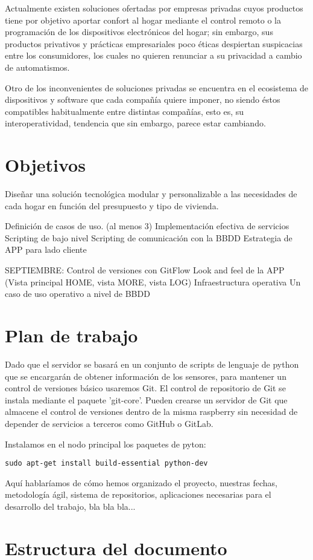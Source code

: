 Actualmente existen soluciones ofertadas por empresas privadas cuyos productos tiene por objetivo aportar confort al hogar mediante el control remoto o la programación de los dispositivos electrónicos del hogar; sin embargo, sus productos privativos y prácticas empresariales poco éticas despiertan suspicacias entre los consumidores, los cuales no quieren renunciar a su privacidad a cambio de automatismos.

Otro de los inconvenientes de soluciones privadas se encuentra en el ecosistema de dispositivos y software que cada compañía quiere imponer, no siendo éstos compatibles habitualmente entre distintas compañías, esto es, su interoperatividad, tendencia que sin embargo, parece estar cambiando.

\section{Objetivos}
\label{ch:Capitulo1.3}

Diseñar una solución tecnológica modular y personalizable a las necesidades de cada hogar en función del presupuesto y tipo de vivienda.

Definición de casos de uso. (al menos 3)
Implementación efectiva de servicios
Scripting de bajo nivel
Scripting de comunicación con la BBDD
Estrategia de APP para lado cliente

SEPTIEMBRE:
Control de versiones con GitFlow
Look and feel de la APP (Vista principal HOME, vista MORE, vista LOG)
Infraestructura operativa
Un caso de uso operativo a nivel de BBDD

\section{Plan de trabajo}
\label{ch:Capitulo1.4}

Dado que el servidor se basará en un conjunto de scripts de lenguaje de python que se encargarán de obtener información de los sensores, para mantener un control de versiones básico usaremos Git. El control de repositorio de Git se instala mediante el paquete 'git-core'. Pueden crearse un servidor de Git que almacene el control de versiones dentro de la misma raspberry sin necesidad de depender de servicios a terceros como GitHub o GitLab.

Instalamos en el nodo principal los paquetes de pyton:
\begin{verbatim}
sudo apt-get install build-essential python-dev
\end{verbatim}

Aquí hablaríamos de cómo hemos organizado el proyecto, nuestras fechas, metodología ágil, sistema de repositorios, aplicaciones necesarias para el desarrollo del trabajo, bla bla bla...

\section{Estructura del documento}
\label{ch:Capitulo1.5}
